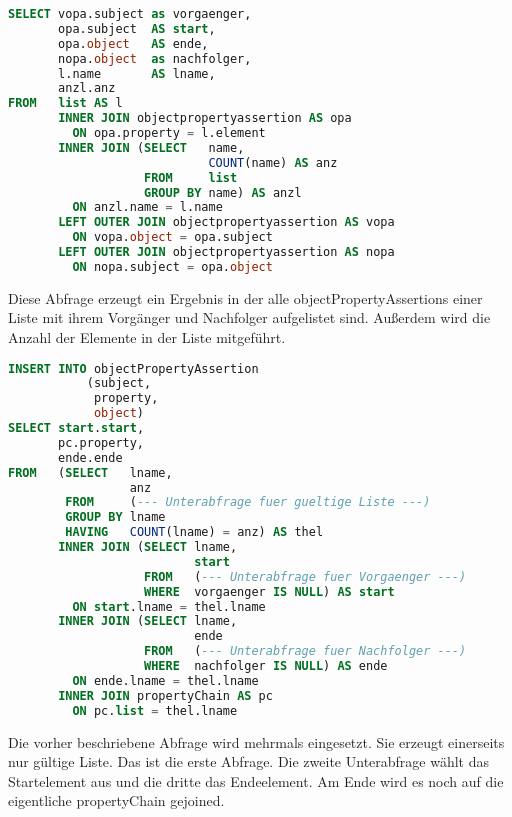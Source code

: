 \begin{lstlisting}[language=SQL]
SELECT vopa.subject as vorgaenger,
       opa.subject  AS start,
       opa.object   AS ende,
       nopa.object  as nachfolger,
       l.name       AS lname,
       anzl.anz
FROM   list AS l
       INNER JOIN objectpropertyassertion AS opa
         ON opa.property = l.element
       INNER JOIN (SELECT   name,
                            COUNT(name) AS anz
                   FROM     list
                   GROUP BY name) AS anzl
         ON anzl.name = l.name
       LEFT OUTER JOIN objectpropertyassertion AS vopa
         ON vopa.object = opa.subject
       LEFT OUTER JOIN objectpropertyassertion AS nopa
         ON nopa.subject = opa.object
\end{lstlisting}

Diese Abfrage erzeugt ein Ergebnis in der alle objectPropertyAssertions einer Liste mit ihrem Vorgänger und Nachfolger aufgelistet sind. Außerdem wird die Anzahl der Elemente in der Liste mitgeführt.

\begin{lstlisting}[language=SQL]
INSERT INTO objectPropertyAssertion
           (subject,
            property,
            object)
SELECT start.start,
       pc.property,
       ende.ende
FROM   (SELECT   lname,
                 anz
        FROM     (--- Unterabfrage fuer gueltige Liste ---)
        GROUP BY lname
        HAVING   COUNT(lname) = anz) AS thel
       INNER JOIN (SELECT lname,
                          start
                   FROM   (--- Unterabfrage fuer Vorgaenger ---)
                   WHERE  vorgaenger IS NULL) AS start
         ON start.lname = thel.lname
       INNER JOIN (SELECT lname,
                          ende
                   FROM   (--- Unterabfrage fuer Nachfolger ---)
                   WHERE  nachfolger IS NULL) AS ende
         ON ende.lname = thel.lname
       INNER JOIN propertyChain AS pc
         ON pc.list = thel.lname
\end{lstlisting}

Die vorher beschriebene Abfrage wird mehrmals eingesetzt. Sie erzeugt einerseits nur gültige Liste. Das ist die erste Abfrage. Die zweite Unterabfrage wählt das Startelement aus und die dritte das Endeelement. Am Ende wird es noch auf die eigentliche propertyChain gejoined.

